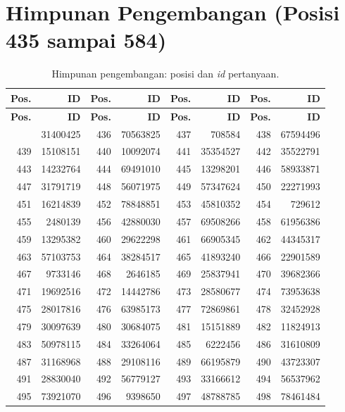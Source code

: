 \normalsize
\section{Himpunan Pengembangan (Posisi 435 sampai 584)}
\label{sec:lamp-id-dev}

\scriptsize

\begin{longtable}{|r|r|r|r|r|r|r|r|}
\caption{Himpunan pengembangan: posisi dan \emph{id} pertanyaan.}\label{tab:lamp-id-dev}\\
\hline
\textbf{Pos.} & \textbf{ID} & \textbf{Pos.} & \textbf{ID} & \textbf{Pos.} & \textbf{ID} & \textbf{Pos.} & \textbf{ID} \\
\hline
\endfirsthead
\hline
\textbf{Pos.} & \textbf{ID} & \textbf{Pos.} & \textbf{ID} & \textbf{Pos.} & \textbf{ID} & \textbf{Pos.} & \textbf{ID} \\
\hline
\endhead
\hline
\endfoot
435 & 31400425 & 436 & 70563825 & 437 & 708584 & 438 & 67594496 \\
439 & 15108151 & 440 & 10092074 & 441 & 35354527 & 442 & 35522791 \\
443 & 14232764 & 444 & 69491010 & 445 & 13298201 & 446 & 58933871 \\
447 & 31791719 & 448 & 56071975 & 449 & 57347624 & 450 & 22271993 \\
451 & 16214839 & 452 & 78848851 & 453 & 45810352 & 454 & 729612 \\
455 & 2480139 & 456 & 42880030 & 457 & 69508266 & 458 & 61956386 \\
459 & 13295382 & 460 & 29622298 & 461 & 66905345 & 462 & 44345317 \\
463 & 57103753 & 464 & 38284517 & 465 & 41893240 & 466 & 22901589 \\
467 & 9733146 & 468 & 2646185 & 469 & 25837941 & 470 & 39682366 \\
471 & 19692516 & 472 & 14442786 & 473 & 28580677 & 474 & 73953638 \\
475 & 28017816 & 476 & 63985173 & 477 & 72869861 & 478 & 32452928 \\
479 & 30097639 & 480 & 30684075 & 481 & 15151889 & 482 & 11824913 \\
483 & 50978115 & 484 & 33264064 & 485 & 6222456 & 486 & 31610809 \\
487 & 31168968 & 488 & 29108116 & 489 & 66195879 & 490 & 43723307 \\
491 & 28830040 & 492 & 56779127 & 493 & 33166612 & 494 & 56537962 \\
495 & 73921070 & 496 & 9398650 & 497 & 48788785 & 498 & 78461484 \\

\end{longtable}
